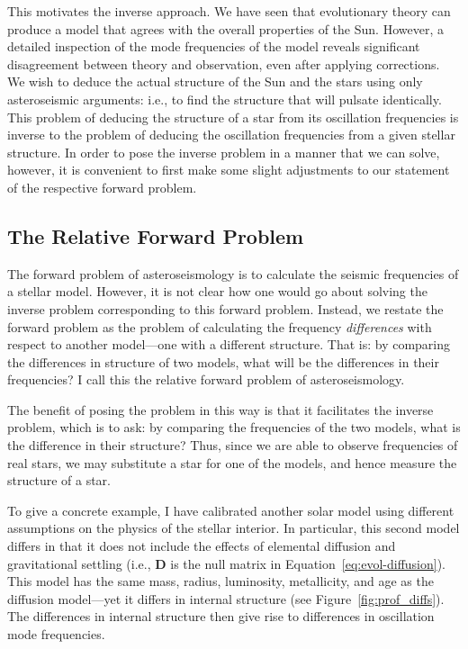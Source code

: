 This motivates the inverse approach. 
We have seen that evolutionary theory can produce a model that agrees with the overall properties of the Sun. 
However, a detailed inspection of the mode frequencies of the model reveals significant disagreement between theory and observation, even after applying corrections. 
We wish to deduce the actual structure of the Sun and the stars using only asteroseismic arguments: i.e., to find the structure that will pulsate identically. 
This problem of deducing the structure of a star from its oscillation frequencies is inverse to the problem of deducing the oscillation frequencies from a given stellar structure. 
In order to pose the inverse problem in a manner that we can solve, however, it is convenient to first make some slight adjustments to our statement of the respective forward problem. 



\subsection{The Relative Forward Problem} \label{sec:variational}
The forward problem of asteroseismology is to calculate the seismic frequencies of a stellar model. 
However, it is not clear how one would go about solving the inverse problem corresponding to this forward problem. 
Instead, we restate the forward problem as the problem of calculating the frequency \emph{differences} with respect to another model---one with a different structure. 
That is: by comparing the differences in structure of two models, what will be the differences in their frequencies? 
I call this the relative forward problem of asteroseismology. 

The benefit of posing the problem in this way is that it facilitates the inverse problem, which is to ask: by comparing the frequencies of the two models, what is the difference in their structure? 
Thus, since we are able to observe frequencies of real stars, we may substitute a star for one of the models, and hence measure the structure of a star. 

To give a concrete example, I have calibrated another solar model using different assumptions on the physics of the stellar interior. 
In particular, this second model differs in that it does not include the effects of elemental diffusion and gravitational settling (i.e., $\mathbf{D}$ is the null matrix in Equation~\ref{eq:evol-diffusion}). 
This model has the same mass, radius, luminosity, metallicity, and age as the diffusion model---yet it differs in internal structure (see Figure~\ref{fig:prof_diffs}). %
The differences in internal structure then give rise to differences in oscillation mode frequencies. %

